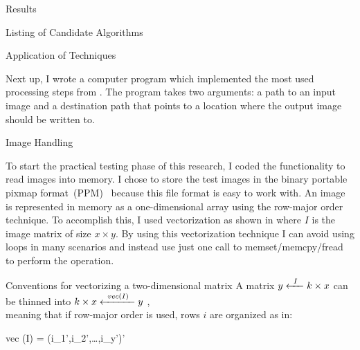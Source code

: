 \documentclass{matthijs}
\begin{document}
\begin{hoofdstuk}{Results}
\begin{paragraaf}{Listing of Candidate Algorithms}
		\end{paragraaf}

		\begin{paragraaf}{Application of Techniques}

			Next up, I wrote a computer program which implemented the most used processing steps from .
			The program takes two arguments: a path to an input image and a destination path that points to a location where the output image should be written to.

			\begin{subparagraaf}{Image Handling}

				To start the practical testing phase of this research, I coded the functionality to read images into memory.
				I chose to store the test images in the binary portable pixmap \mbox{format (PPM) \cite{pawar2011implementation}} because this file format is easy to work with.
				An image is represented in memory as a one-dimensional array using the row-major order technique.
				To accomplish this, I used vectorization as shown in  where $I$ is the image matrix of size $x \times y$.
				By using this vectorization technique I can avoid using loops in many scenarios and instead use just one call to memset/memcpy/fread to perform the operation.

				\begin{figuur}{Conventions for vectorizing a two-dimensional matrix}
					\onehalfspacing
					A matrix $y \xleftarrow{\hspace{1ex}I\hspace{1ex}} k \times x$ can be thinned into $k \times x \xleftarrow{\hspace{1ex}vec(I)\hspace{1ex}} y$ \cite{macedo2013typing}, \\
					meaning that if row-major order is used, rows $i$ are organized as in:

					\vspace{-3ex}

					\begin{largequation}
						vec (I) = (i_1',i_2',\dots,i_y')'
					\end{largequation}

					\vspace{-1ex}%
					\cite{dhrymes2000mathematics}
				\end{figuur}


\end{subparagraaf}
\end{paragraaf}
\end{hoofdstuk}
\end{document}
